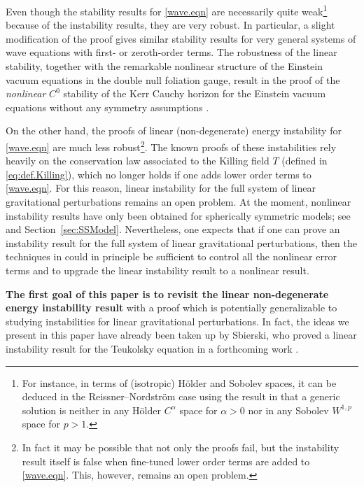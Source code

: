 \documentclass[10pt, reqno]{amsart}
\theoremstyle{definition}
\theoremstyle{remark}
\numberwithin{equation}{section}
\newcommand{\0}{\emptyset}
\newcommand{\alp}{\alpha}
\begin{document}
\begin{figure}[h]
\begin{center}
\def\svgwidth{200px}
 
\caption{} \label{fig:main.thm}
\end{center}
\end{figure}

Even though the stability results for \eqref{wave.eqn} are necessarily quite weak\footnote{For instance, in terms of (isotropic) H\"older and Sobolev spaces, it can be deduced in the Reissner--Nordstr\"om case using the result in \cite{AAG, D2, Gleeson} that a generic solution is neither in any H\"older $C^{\alpha}$ space for $\alp>0$ nor in any Sobolev $W^{1,p}$ space for $p>1$.} because of the instability results, they are very robust. In particular, a slight modification of the proof gives similar stability results for very general systems of wave equations with first- or zeroth-order terms. The robustness of the linear stability, together with the remarkable nonlinear structure of the Einstein vacuum equations in the double null foliation gauge, result in the proof of the \emph{nonlinear} $C^0$ stability of the Kerr Cauchy horizon for the Einstein vacuum equations without any symmetry assumptions \cite{DL}.

On the other hand, the proofs of linear (non-degenerate) energy instability for \eqref{wave.eqn} are much less robust\footnote{In fact it may be possible that not only the proofs fail, but the instability result itself is false when fine-tuned lower order terms are added to \eqref{wave.eqn}. This, however, remains an open problem.}. The known proofs \cite{LO.instab, LS} of these instabilities rely heavily on the conservation law associated to the Killing field $T$ (defined in \eqref{eq:def.Killing}), which no longer holds if one adds lower order terms to \eqref{wave.eqn}. For this reason, linear instability for the full system of linear gravitational perturbations remains an open problem. At the moment, nonlinear instability results have only been obtained for spherically symmetric models; see \cite{D2, LO.interior, VDM, VDM4} and Section~\ref{sec:SSModel}. Nevertheless, one expects that if one can prove an instability result for the full system of linear gravitational perturbations, then the techniques in \cite{DL} could in principle be sufficient to control all the nonlinear error terms and to upgrade the linear instability result to a nonlinear result.
	
\textbf{The first goal of this paper is to revisit the linear non-degenerate energy instability result} with a proof which is potentially generalizable to studying instabilities for linear gravitational perturbations. In fact, the ideas we present in this paper have already been taken up by Sbierski, who proved a linear instability result for the Teukolsky equation in a forthcoming work \cite{Sbierski.Teukolsky}.
\end{document}
